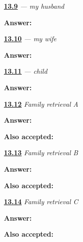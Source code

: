 \noindent\begin{minipage}[t]{\linewidth}
\raggedright
\hyperlink{review-JA-C13-otto-recall}{\textbf{13.9}} \emph{ — my husband}\par
\small \textbf{Answer:} \par
\end{minipage}\par\medskip

\noindent\begin{minipage}[t]{\linewidth}
\raggedright
\hyperlink{review-JA-C13-tsuma-recall}{\textbf{13.10}} \emph{ — my wife}\par
\small \textbf{Answer:} \par
\end{minipage}\par\medskip

\noindent\begin{minipage}[t]{\linewidth}
\raggedright
\hyperlink{review-JA-C13-kodomo-recall}{\textbf{13.11}} \emph{ — child}\par
\small \textbf{Answer:} \par
\end{minipage}\par\medskip

\noindent\begin{minipage}[t]{\linewidth}
\raggedright
\hyperlink{review-JA-R13-family-a-recall}{\textbf{13.12}} \emph{Family retrieval A}\par
\small \textbf{Answer:} \par
\footnotesize \textbf{Also accepted:}  
\end{minipage}\par\medskip

\noindent\begin{minipage}[t]{\linewidth}
\raggedright
\hyperlink{review-JA-R13-family-b-recall}{\textbf{13.13}} \emph{Family retrieval B}\par
\small \textbf{Answer:} \par
\footnotesize \textbf{Also accepted:}   
\end{minipage}\par\medskip

\noindent\begin{minipage}[t]{\linewidth}
\raggedright
\hyperlink{review-JA-R13-family-c-recall}{\textbf{13.14}} \emph{Family retrieval C}\par
\small \textbf{Answer:} \par
\footnotesize \textbf{Also accepted:}   
\end{minipage}\par\medskip

